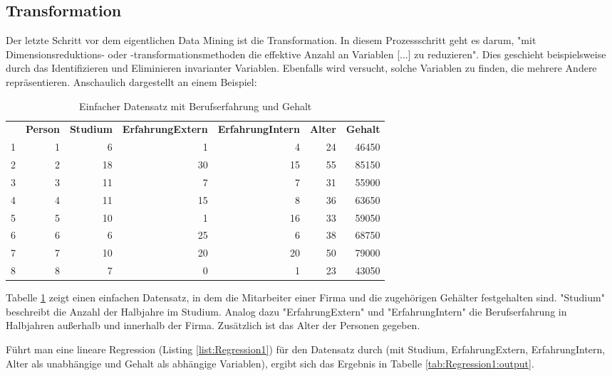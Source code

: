 \subsection{Transformation}
Der letzte Schritt vor dem eigentlichen Data Mining ist die Transformation. In diesem Prozessschritt geht es darum, "mit Dimensionsreduktions- oder -transformationsmethoden die effektive Anzahl an Variablen [...] zu reduzieren"\citep[S.~42; eigene Übersetzung]{fayyad_data_1996}. Dies geschieht beispielsweise durch das Identifizieren und Eliminieren invarianter Variablen. Ebenfalls wird versucht, solche Variablen zu finden, die mehrere Andere repräsentieren. Anschaulich dargestellt an einem Beispiel:\par
\begin{table}[H] \centering
\begin{tabular}{|r|r|r|r|r|r|r|}
  \hline
 & \textbf{Person} & \textbf{Studium} & \textbf{ErfahrungExtern} & \textbf{ErfahrungIntern} & \textbf{Alter} & \textbf{Gehalt} \\ 
\hhline{=======}
1 &   1 &   6 &   1 &   4 &  24 & 46450 \\ 
  2 &   2 &  18 &  30 &  15 &  55 & 85150 \\ 
  3 &   3 &  11 &   7 &   7 &  31 & 55900 \\ 
  4 &   4 &  11 &  15 &   8 &  36 & 63650 \\ 
  5 &   5 &  10 &   1 &  16 &  33 & 59050 \\ 
  6 &   6 &   6 &  25 &   6 &  38 & 68750 \\ 
  7 &   7 &  10 &  20 &  20 &  50 & 79000 \\ 
  8 &   8 &   7 &   0 &   1 &  23 & 43050 \\ 
   \hline
\end{tabular}
\caption{Einfacher Datensatz mit Berufserfahrung und Gehalt}
\label{tab:Beispiel_Berufserfahrung_R_output_simpleData}
\end{table}
Tabelle \ref{tab:Beispiel_Berufserfahrung_R_output_simpleData} zeigt einen einfachen Datensatz, in dem die Mitarbeiter einer Firma und die zugehörigen Gehälter festgehalten sind. "Studium" beschreibt die Anzahl der Halbjahre im Studium. Analog dazu "ErfahrungExtern" und "ErfahrungIntern" die Berufserfahrung in Halbjahren außerhalb und innerhalb der Firma. Zusätzlich ist das Alter der Personen gegeben.\par
Führt man eine lineare Regression (Listing \ref{list:Regression1}) für den Datensatz durch (mit Studium, ErfahrungExtern, ErfahrungIntern, Alter als unabhängige und Gehalt als abhängige Variablen), ergibt sich das Ergebnis in Tabelle \ref{tab:Regression1:output}.

